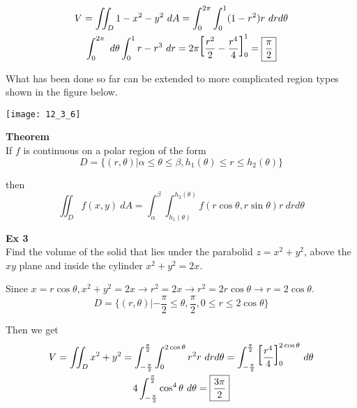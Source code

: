\documentclass{article}
\begin{document}
  \[
    \begin{gathered}
    V = \iint_D 1-x^{2}-y^{2}~dA = \int^{2\pi}_{0} \int^{1}_{0} (1-r^{2})r ~drd\theta\\
  \int^{2\pi}_{0} ~d\theta \int^{1}_{0} r-r^{3}~dr = 2\pi \text{\huge{[}} \frac{r^{2}}{2}-\frac{r^{4}}{4} \text{\huge{]}}^{1}_0=\boxed{\frac{\pi}{2}}
    \end{gathered}
  \]

  What has been done so far can be extended to more complicated region types shown in the figure below.
  
  \begin{center}
    \texttt{[image: 12\_3\_6]}
  \end{center}

  \textbf{Theorem}\\
  If $ f $ is continuous on a polar region of the form
  \[
    D=\{ (r,\theta) | \alpha \le \theta \le \beta, h_1(\theta) \le r \le h_2(\theta) \}
  \]

  then
  \[
    \iint_D f(x,y)~dA = \int^{\beta}_{\alpha} \int^{h_2(\theta)}_{h_1(\theta)} f(r\cos{\theta},r\sin{\theta})r ~drd\theta 
  \]
  
  \textbf{Ex 3}\\
  Find the volume of the solid that lies under the parabolid $ z=x^{2}+y^{2} $, above the $ xy $ plane and inside the cylinder $ x^{2}+y^{2}=2x $.

  Since $ x=r\cos{\theta}, x^{2} +y^{2}=2x \to r^{2} =2x \to r^{2}=2r\cos{\theta} \to r=2\cos{\theta}$.
  \[
    D=\{ (r,\theta) | -\frac{\pi}{2}\le \theta, \frac{\pi}{2}, 0 \le r \le 2 \cos{\theta} \}
  \]
  
  Then we get
  \[
    \begin{gathered}
    V=\iint_D x^{2}+y^{2} = \int^{\frac{\pi}{2}}_{-\frac{\pi}{2}} \int^{2\cos{\theta}}_{0} r^{2}r ~ drd\theta = \int^{\frac{\pi}{2}}_{-\frac{\pi}{2}} \text{\huge{[}} \frac{r^{4}}{4} \text{\huge{]}}^{2\cos{\theta}}_0~d\theta\\
    4 \int^{\frac{\pi}{2}}_{-\frac{\pi}{2}} \cos^{4}{\theta}~d\theta=\boxed{\frac{3\pi}{2}}
    \end{gathered}
  \]
  
  
\end{document}
